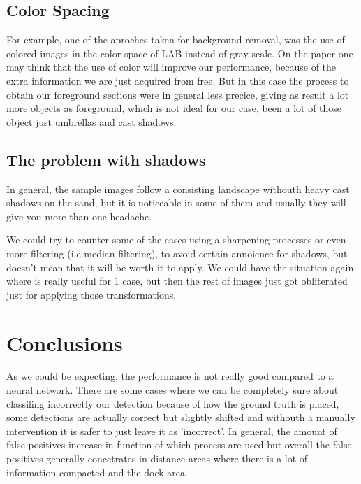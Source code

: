 \documentclass[11pt]{article}
\begin{document}
\subsection*{Color Spacing}
 For example, one of the aproches taken for background removal, was the use of colored images in the color space of LAB  instead of gray scale. On the paper one may think that the use of color will improve our performance, because of the extra information we are just acquired from free. But in this case the process to obtain our foreground sections were in general less precice, giving as result a lot more objects as foreground, which is not ideal for our case, been a lot of those object just umbrellas and cast shadows.\newline

\subsection*{The problem with shadows}

In general, the sample images follow a consisting landscape withouth heavy cast shadows on the sand, but it is noticeable in some of them and usually they will give you more than one headache.\newline 

We could try to counter some of the cases using a sharpening processes or even more filtering (i.e median filtering), to avoid certain annoience for shadows, but doesn't mean that it will be worth it to apply. We could have the situation again where is really useful for 1 case, but then the rest of images just got obliterated just for applying those transformations.



\section{Conclusions}

As we could be expecting, the performance is not really good compared to a neural network. There are some cases where we can be completely sure about classifing incorrectly our detection because of how the ground truth is placed, some detections are actually correct but slightly shifted and withouth a manually intervention it is safer to just leave it as 'incorrect'. In general, the amount of false positives increase in function of which process are used but overall the false positives generally concetrates in distance areas where there is a lot of information compacted and the dock area.\newline
\end{document}
